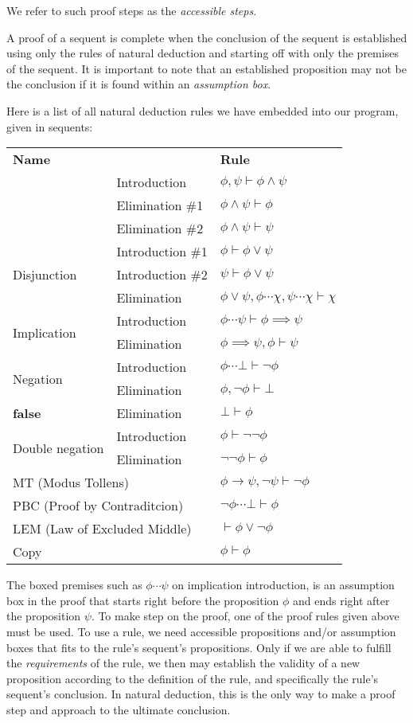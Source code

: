 \documentclass{article}
\newcommand{\imp}{\ensuremath{\rightarrow}}
\newcommand{\false}{\textbf{false}}
\begin{document}
We refer to such proof steps as the \textit{accessible steps}.

A proof of a sequent is complete when the conclusion of the
sequent is established using only the rules of natural deduction and
starting off with only the premises of the sequent. It is important to
note that an established proposition may not be the conclusion if it is
found within an \textit{assumption box}.

Here is a list of all natural deduction rules we have embedded into
our program, given in sequents:

\begin{center}
	\renewcommand{\arraystretch}{1.2}
	\newcommand{\nl}{\\[4pt]}
	\newcommand{\nll}{\\[4pt]\hline}
	\begin{tabular}{l l|l}
		\multicolumn{2}{l|}{\textbf{Name}} & \textbf{Rule}\\\hhline{==|=}
		\multirow{3}{*}{Conjunction}
		& Introduction    & $\phi, \psi \vdash \phi \land \psi$\nl
		& Elimination \#1 & $\phi \land \psi \vdash \phi$\nl
		& Elimination \#2 & $\phi \land \psi \vdash \psi$\nll
		\multirow{3}{*}{Disjunction}
		& Introduction \#1 & $\phi \vdash \phi \lor \psi$\nl
		& Introduction \#2 & $\psi \vdash \phi \lor \psi$\nl
		& Elimination      & $\phi \lor \psi, \boxed{\phi \dotsb \chi},
			\boxed{\psi \dotsb \chi} \vdash \chi$\nll
		\multirow{2}{*}{Implication}
		& Introduction & $\boxed{\phi \dotsb \psi} \vdash \phi \implies \psi$\nl
		& Elimination  & $\phi \implies \psi, \phi \vdash \psi$\nll
		\multirow{2}{*}{Negation}
		& Introduction & $\boxed{\phi \dotsb \bot} \vdash \neg\phi$\nl
		& Elimination  & $\phi, \neg\phi \vdash \bot$\nll
		\multirow{1}{*}{\false{}}
		& Elimination  & $\bot \vdash \phi$\nll
		\multirow{2}{*}{Double negation}
		& Introduction & $\phi \vdash \neg\neg\phi$\nl
		& Elimination  & $\neg\neg\phi \vdash \phi$\nll
		\multicolumn{2}{l|}{MT (Modus Tollens)}
		& $\phi \imp \psi, \neg\psi \vdash \neg\phi$\nll
		\multicolumn{2}{l|}{PBC (Proof by Contraditcion)}
		& $\boxed{\neg\phi \dotsb \bot} \vdash \phi$\nll
		\multicolumn{2}{l|}{LEM (Law of Excluded Middle)}
		& $\vdash \phi \lor \neg\phi$\nll
		\multicolumn{2}{l|}{Copy}
		& $\phi \vdash \phi$
	\end{tabular}
\end{center}

The boxed premises such as $\boxed{\phi \dotsb \psi}$ on
implication introduction, is an assumption box in the proof
that starts right before the proposition $\phi$ and ends right
after the proposition $\psi$. 
To make step on the proof, one of the proof rules given
above must be used. To use a rule, we need accessible propositions
and/or assumption boxes that fits to the rule's sequent's propositions.
Only if we are able to fulfill the \textit{requirements} of the rule,
we then may establish the validity of a new proposition according
to the definition of the rule, and specifically the rule's sequent's
conclusion. In natural deduction, this is the only way to
make a proof step and approach to the ultimate conclusion.
\end{document}
